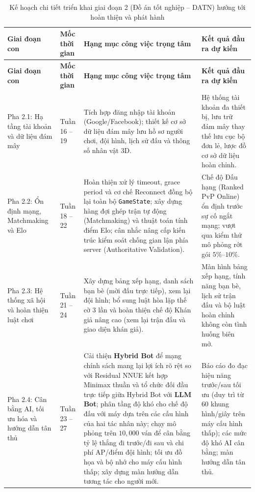 {\small
\begin{longtable}{|L{2.5cm}|L{2.0cm}|L{5.7cm}|L{4.7cm}|}
    \caption{Kế hoạch chi tiết triển khai giai đoạn 2 (Đồ án tốt nghiệp -- DATN) hướng tới hoàn thiện và phát hành}
    \label{tab:stage2_plan} \\
    \hline
    \textbf{Giai đoạn con} & \textbf{Mốc thời gian} & \textbf{Hạng mục công việc trọng tâm} & \textbf{Kết quả đầu ra dự kiến} \\
    \hline
    \endfirsthead
    \hline
    \textbf{Giai đoạn con} & \textbf{Mốc thời gian} & \textbf{Hạng mục công việc trọng tâm} & \textbf{Kết quả đầu ra dự kiến} \\
    \hline
    \endhead
    \hline
    \endfoot
        Pha 2.1: Hạ tầng tài khoản và dữ liệu đám mây & Tuần 16 -- 19 & Tích hợp đăng nhập tài khoản (Google/Facebook); thiết kế cơ sở dữ liệu đám mây lưu hồ sơ người chơi, đội hình, lịch sử đấu và thông số nhân vật 3D. & Hệ thống tài khoản đa thiết bị, lưu trữ đám mây thay thế lưu cục bộ đơn lẻ, lược đồ cơ sở dữ liệu hoàn chỉnh. \\
        \hline
        Pha 2.2: Ổn định mạng, Matchmaking và Elo & Tuần 18 -- 22 & Hoàn thiện xử lý timeout, grace period và cơ chế Reconnect đồng bộ lại toàn bộ \texttt{GameState}; xây dựng hàng đợi ghép trận tự động (Matchmaking) và thuật toán tính điểm Elo; cân nhắc nâng cấp kiến trúc kiểm soát chống gian lận phía server (Authoritative Validation). & Chế độ Đấu hạng (Ranked PvP Online) ổn định trước sự cố ngắt mạng; vượt qua kiểm thử mô phỏng rớt gói $5\%$--$10\%$. \\
        \hline
        Pha 2.3: Hệ thống xã hội và hoàn thiện luật chơi & Tuần 21 -- 24 & Xây dựng bảng xếp hạng, danh sách bạn bè (mời đấu trực tiếp), xem lại đội hình; bổ sung luật hòa lặp thế cờ $3$ lần và hoàn thiện chế độ Khán giả nâng cao (xem lại trận đấu và giao diện khán giả). & Màn hình bảng xếp hạng, tính năng bạn bè, lịch sử trận đấu và bộ luật hoàn chỉnh không còn tình huống biên mở. \\
        \hline
        Pha 2.4: Cân bằng AI, tối ưu hóa và hướng dẫn tân thủ & Tuần 23 -- 27 & Cải thiện \textbf{Hybrid Bot} để mạng chính sách mang lại lợi ích rõ rệt so với Residual NNUE kết hợp Minimax thuần và tổ chức đối đầu trực tiếp giữa Hybrid Bot với \textbf{LLM Bot}; phân tầng độ khó cho chế độ đấu với máy dựa trên các cấu hình của hai tác nhân này; chạy mô phỏng trên $10{,}000$ ván để cân bằng tỷ lệ thắng đi trước/đi sau và chi phí AP/điểm đội hình; tối ưu đồ họa và bộ nhớ cho máy cấu hình thấp; xây dựng màn hướng dẫn tương tác cho người mới. & Báo cáo đo đạc hiệu năng trước/sau tối ưu (duy trì từ $60$ khung hình/giây trên máy cấu hình thấp); các mức độ khó AI cân bằng; màn hướng dẫn tân thủ. \\

\end{longtable}}
